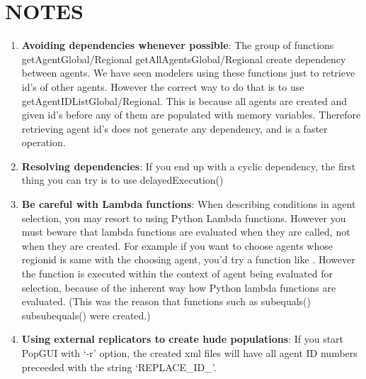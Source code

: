 \section{NOTES}
\begin{enumerate}
\item {\bf Avoiding dependencies whenever possible}: The group of functions getAgentGlobal/Regional getAllAgentsGlobal/Regional create dependency between agents. We have seen modelers using these functions just to retrieve id's of other agents. However the correct way to do that is to use getAgentIDListGlobal/Regional. This is because  all agents are created and  given id's before any of them are populated with memory variables. Therefore retrieving agent id's does not generate any dependency, and is a faster operation.
\item {\bf Resolving dependencies}: If you end up with a cyclic dependency, the first thing you can try is to use delayedExecution()
\item {\bf Be careful with Lambda functions}: When describing conditions in agent selection, you may resort to using Python Lambda functions. However you must beware that lambda functions are evaluated when they are called, not when they are created. For example if you want to choose agents whose regionid is same with the choosing agent, you'd try a function like . However the function is executed within the context of agent being evaluated for selection, because of the inherent way how Python lambda functions are evaluated. (This was the reason that functions such as subequals() subsubequals() were created.)
\item {\bf Using external replicators to create hude populations}: If you start PopGUI with `-r' option, the created xml files will have all agent ID numbers preceeded with the string `REPLACE\_ID\_'. 
\end{enumerate}